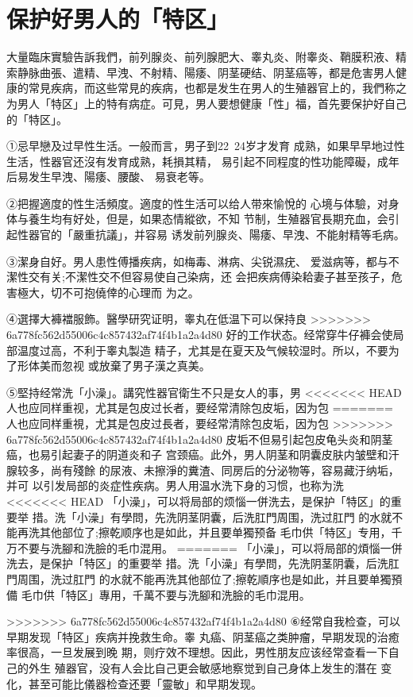 \documentclass[12pt,UTF8]{ctexbook}
\begin{document}
\section{保护好男人的「特区」}

大量臨床實驗告訴我們，前列腺炎、前列腺肥大、睾丸炎、附睾炎、鞘膜积液、精索静脉曲張、遣精、早洩、不射精、陽痿、阴茎硬结、阴茎癌等，都是危害男人健康的常見疾病，而这些常見的疾病，也都是发生在男人的生殖器官上的，我們称之为男人「特区」上的特有病症。可見，男人要想健康「性」福，首先要保护好自己的「特区」。

①忌早戀及过早性生活。一般而言，男子到22~24岁才发育
成熟，如果早早地过性生活，性器官还沒有发育成熟，耗損其精，
易引起不同程度的性功能障礙，成年后易发生早洩、陽痿、腰酸、
易衰老等。

②把握適度的性生活頻度。適度的性生活可以给人带來愉悅的
心境与体驗，对身体与養生均有好处，但是，如果态情縱欲，不知
节制，生殖器官長期充血，会引起性器官的「嚴重抗議」，并容易
诱发前列腺炎、陽痿、早洩、不能射精等毛病。

③潔身自好。男人患性傅播疾病，如梅毒、淋病、尖锐濕疣、
爱滋病等，都与不潔性交有关;不潔性交不但容易使自己染病，还
会把疾病傅染耠妻子甚至孩子，危害極大，切不可抱僥倖的心理而
为之。

④選擇大褲襠服飾。醫學研究证明，睾丸在低温下可以保持良
>>>>>>> 6a778fc562d55006c4c857432af74f4b1a2a4d80
好的工作状态。经常穿牛仔褲会使局部温度过高，不利于睾丸製造
精子，尤其是在夏天及气候较湿时。所以，不要为了形体美而忽视
或放棄了男子漢之真美。

⑤堅持经常洗「小澡」。講究性器官衛生不只是女人的事，男
<<<<<<< HEAD
人也应同样重视，尤其是包皮过长者，要经常清除包皮垢，因为包
=======
人也应同样重視，尤其是包皮过長者，要经常清除包皮垢，因为包
>>>>>>> 6a778fc562d55006c4c857432af74f4b1a2a4d80
皮垢不但易引起包皮龟头炎和阴茎癌，也易引起妻子的阴道炎和子
宫颈癌。此外，男人阴茎和阴囊皮肤内皱壁和汗腺较多，尚有殘餘
的尿液、未擦淨的糞渣、同房后的分泌物等，容易藏汙纳垢，并可
以引发局部的炎症性疾病。男人用温水洗下身的习惯，也称为洗
<<<<<<< HEAD
「小澡」，可以将局部的烦惱一併洗去，是保护「特区」的重要举
措。洗「小澡」有學問，先洗阴茎阴囊，后洗肛門周围，洗过肛門
的水就不能再洗其他部位了;擦乾顺序也是如此，并且要单獨预备
毛巾供「特区」专用，千万不要与洗腳和洗臉的毛巾混用。
=======
「小澡」，可以将局部的煩惱一併洗去，是保护「特区」的重要举
措。洗「小澡」有學問，先洗阴茎阴囊，后洗肛門周围，洗过肛門
的水就不能再洗其他部位了;擦乾順序也是如此，并且要单獨預備
毛巾供「特区」專用，千萬不要与洗腳和洗臉的毛巾混用。

>>>>>>> 6a778fc562d55006c4c857432af74f4b1a2a4d80
⑥经常自我检查，可以早期发现「特区」疾病并挽救生命。睾
丸癌、阴茎癌之类肿瘤，早期发现的治癒率很高，一旦发展到晚
期，则疗效不理想。因此，男性朋友应该经常查看一下自己的外生
殖器官，没有人会比自己更会敏感地察觉到自己身体上发生的潛在
变化，甚至可能比儀器检查还要「靈敏」和早期发现。
\end{document}
